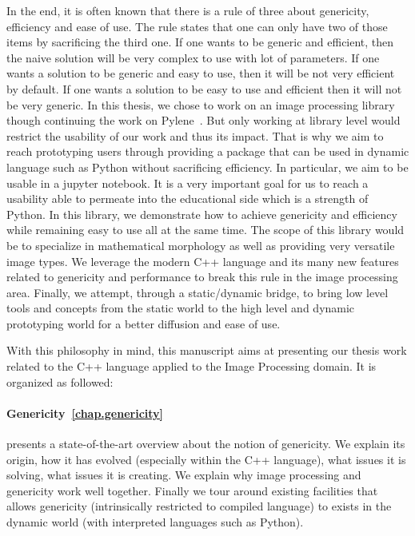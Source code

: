 
In the end,  it is often known that there is a rule of three about genericity, efficiency and
ease of use. The rule states that one can only have two of those items by sacrificing the third one. If one wants to be
generic and efficient, then the naive solution will be very complex to use with lot of parameters. If one wants a
solution to be generic and easy to use, then it will be not very efficient by default. If one wants a solution to be
easy to use and efficient then it will not be very generic. In this thesis, we chose to work on an image processing
library though continuing the work on Pylene~\cite{carlinet.2018.pylena}. But only working at library level would
restrict the usability of our work and thus its impact. That is why we aim to reach prototyping users through providing
a package that can be used in dynamic language such as Python without sacrificing efficiency. In particular, we aim to
be usable in a jupyter notebook. It is a very important goal for us to reach a usability able to permeate into the
educational side which is a strength of Python. In this library, we demonstrate how to achieve genericity and efficiency
while remaining easy to use all at the same time. The scope of this library would be to specialize in mathematical
morphology as well as providing very versatile image types. We leverage the modern C++ language and its many new
features related to genericity and performance to break this rule in the image processing area. Finally, we attempt,
through a static/dynamic bridge, to bring low level tools and concepts from the static world to the high level and
dynamic prototyping world for a better diffusion and ease of use.

With this philosophy in mind, this manuscript aims at presenting our thesis work related to the C++ language applied to
the Image Processing domain. It is organized as followed:

\paragraph{Genericity~\ref{chap.genericity}} presents a state-of-the-art overview about the notion of genericity. We
explain its origin, how it has evolved (especially within the C++ language), what issues it is solving, what issues it
is creating. We explain why image processing and genericity work well together. Finally we tour around existing
facilities that allows genericity (intrinsically restricted to compiled language) to exists in the dynamic world (with
interpreted languages such as Python).

